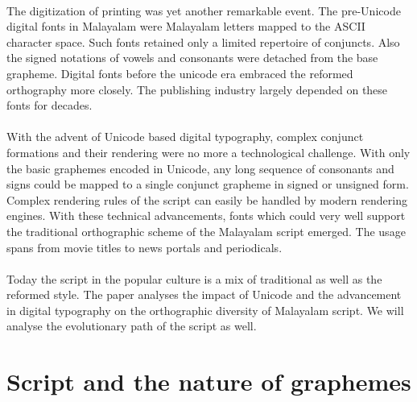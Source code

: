 \documentclass[10pt]{article}
\begin{document}
\paragraph{}
The digitization of printing was yet another remarkable event. The pre-Unicode digital fonts in Malayalam were Malayalam letters mapped to the ASCII character space.  Such fonts retained only a limited repertoire of conjuncts. Also the signed notations of vowels and consonants were detached from the base grapheme. Digital fonts before the unicode era embraced the reformed orthography more closely. The publishing industry largely depended on these fonts for decades.


\paragraph{}
With the advent of Unicode based digital typography, complex conjunct formations and their rendering were no more a technological challenge. With only the basic graphemes  encoded in Unicode, any long sequence of consonants and signs could be mapped to a single conjunct grapheme in signed or unsigned form.  Complex rendering rules of the script can easily be handled by modern rendering engines. With these technical advancements, fonts which could very well support the traditional orthographic scheme of the Malayalam script emerged. The usage spans from movie titles to news portals and periodicals.

\paragraph{}
Today the script in the popular culture is a mix of traditional as well as the reformed style. The paper analyses the impact of Unicode and the advancement in digital typography on the orthographic diversity of Malayalam script. We will analyse the evolutionary path of the script as well.


\section{Script and the nature of graphemes}
\end{document}
